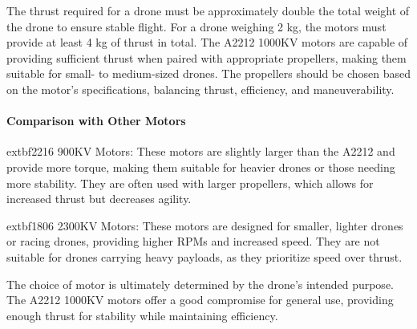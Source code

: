     The thrust required for a drone must be approximately double the total weight of the drone to ensure stable flight. For a drone weighing 2 kg, the motors must provide at least 4 kg of thrust in total. The A2212 1000KV motors are capable of providing sufficient thrust when paired with appropriate propellers, making them suitable for small- to medium-sized drones. The propellers should be chosen based on the motor's specifications, balancing thrust, efficiency, and maneuverability.
    
    \paragraph{Comparison with Other Motors}
    	extbf{2216 900KV Motors}: These motors are slightly larger than the A2212 and provide more torque, making them suitable for heavier drones or those needing more stability. They are often used with larger propellers, which allows for increased thrust but decreases agility.
    
    	extbf{1806 2300KV Motors}: These motors are designed for smaller, lighter drones or racing drones, providing higher RPMs and increased speed. They are not suitable for drones carrying heavy payloads, as they prioritize speed over thrust.
    
    The choice of motor is ultimately determined by the drone's intended purpose. The A2212 1000KV motors offer a good compromise for general use, providing enough thrust for stability while maintaining efficiency.

    
    


